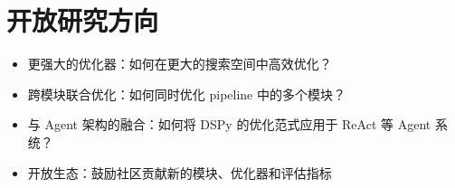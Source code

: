 \section{开放研究方向}

\begin{itemize}
    \item 更强大的优化器：如何在更大的搜索空间中高效优化？
    \item 跨模块联合优化：如何同时优化 pipeline 中的多个模块？
    \item 与 Agent 架构的融合：如何将 DSPy 的优化范式应用于 ReAct 等 Agent 系统？
    \item 开放生态：鼓励社区贡献新的模块、优化器和评估指标
\end{itemize}

